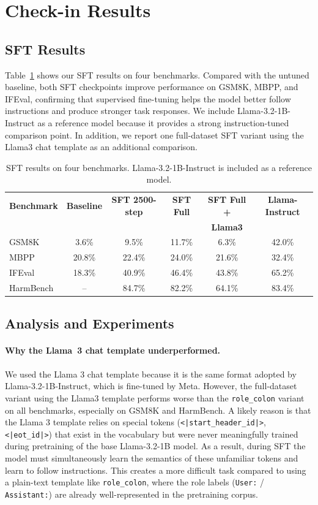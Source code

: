 \documentclass[11pt]{article}
\begin{document}
\section{Check-in Results}
\subsection{SFT Results}
Table~\ref{tab:sft_results} shows our SFT results on four benchmarks. Compared with the untuned baseline, both SFT checkpoints improve performance on GSM8K, MBPP, and IFEval, confirming that supervised fine-tuning helps the model better follow instructions and produce stronger task responses. We include Llama-3.2-1B-Instruct as a reference model because it 
provides a strong instruction-tuned comparison point. In addition, we report one full-dataset SFT variant using the Llama3 chat template as an additional comparison.
\begin{table}[htbp]
\centering
\small
\begin{tabular}{lccccc}
\hline
\textbf{Benchmark} & \textbf{Baseline} & \textbf{SFT 2500-step} & \textbf{SFT Full} & \textbf{SFT Full +} & \textbf{Llama-Instruct} \\
 &  &  &  & \textbf{Llama3} &  \\
\hline
GSM8K     & 3.6\%  & 9.5\%  & 11.7\% & 6.3\%  & 42.0\% \\
MBPP      & 20.8\% & 22.4\% & 24.0\% & 21.6\% & 32.4\% \\
IFEval    & 18.3\% & 40.9\% & 46.4\% & 43.8\% & 65.2\% \\
HarmBench & --     & 84.7\% & 82.2\% & 64.1\% & 83.4\% \\
\hline
\end{tabular}
\caption{SFT results on four benchmarks. Llama-3.2-1B-Instruct is included as a reference model.}
\label{tab:sft_results}
\end{table}

\subsection{Analysis and Experiments}
\paragraph{Why the Llama~3 chat template underperformed.}
We used the Llama 3 chat template because it is the same format adopted by Llama-3.2-1B-Instruct, which is fine-tuned by Meta. However, the full-dataset variant using the Llama3 template performs worse than the \texttt{role\_colon} variant on all benchmarks, especially on GSM8K and HarmBench. A likely reason is that the Llama 3 template relies on special tokens (\texttt{<|start\_header\_id|>}, \texttt{<|eot\_id|>}) that exist in the vocabulary but were never meaningfully trained during pretraining of the base Llama-3.2-1B model. As a result, during SFT the model must simultaneously learn the semantics of these unfamiliar tokens and learn to follow instructions. This creates a more difficult task compared to using a plain-text template like \texttt{role\_colon}, where the role labels (\texttt{User:} / \texttt{Assistant:}) are already well-represented in the pretraining corpus.
\end{document}
